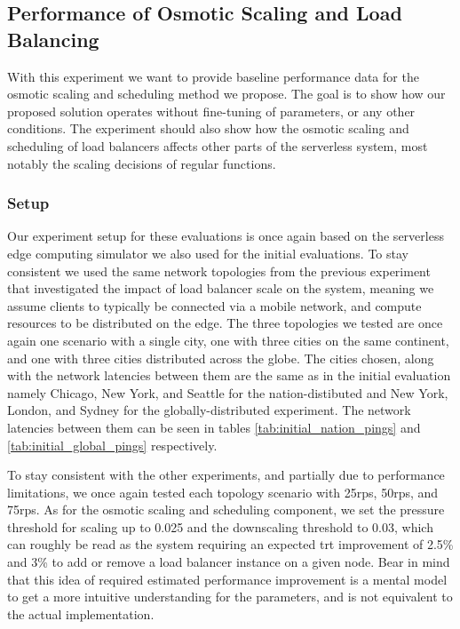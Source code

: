 \subsection{Performance of Osmotic Scaling and Load Balancing}
With this experiment we want to provide baseline performance data for the osmotic scaling and scheduling method we propose. The goal is to show how our proposed solution operates without fine-tuning of parameters, or any other conditions. The experiment should also show how the osmotic scaling and scheduling of load balancers affects other parts of the serverless system, most notably the scaling decisions of regular functions.
\subsubsection{Setup}
Our experiment setup for these evaluations is once again based on the serverless edge computing simulator we also used for the initial evaluations. To stay consistent we used the same network topologies from the previous experiment that investigated the impact of load balancer scale on the system, meaning we assume clients to typically be connected via a mobile network, and compute resources to be distributed on the edge. The three topologies we tested are once again one scenario with a single city, one with three cities on the same continent, and one with three cities distributed across the globe. The cities chosen, along with the network latencies between them are the same as in the initial evaluation namely Chicago, New York, and Seattle for the nation-distibuted and New York, London, and Sydney for the globally-distributed experiment. The network latencies between them can be seen in tables \ref{tab:initial_nation_pings} and \ref{tab:initial_global_pings} respectively.

To stay consistent with the other experiments, and partially due to performance limitations, we once again tested each topology scenario with 25\gls{rps}, 50\gls{rps}, and 75\gls{rps}. As for the osmotic scaling and scheduling component, we set the pressure threshold for scaling up to 0.025 and the downscaling threshold to 0.03, which can roughly be read as the system requiring an expected \gls{trt} improvement of 2.5\% and 3\% to add or remove a load balancer instance on a given node. Bear in mind that this idea of required estimated performance improvement is a mental model to get a more intuitive understanding for the parameters, and is not equivalent to the actual implementation.

